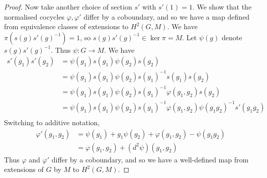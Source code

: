 \begin{proof}
    Now take another choice of section \( s' \) with \( s'(1) = 1 \).
    We show that the normalised cocycles \( \varphi, \varphi' \) differ by a coboundary, and so we have a map defined from equivalence classes of extensions to \( H^2(G, M) \).
    We have \( \pi(s(g) s'(g)^{-1}) = 1 \), so \( s(g) s'(g)^{-1} \in \ker \pi = M \).
    Let \( \psi(g) \) denote \( s(g) s'(g)^{-1} \).
    Thus \( \psi : G \to M \).
    We have
    \begin{align*}
        s'(g_1) s'(g_2) &= \psi(g_1) s(g_1) \psi(g_2) s(g_2) \\
        &= \psi(g_1) s(g_1) \psi(g_2) s(g_1)^{-1} s(g_1) s(g_2) \\
        &= \psi(g_1) s(g_1) \psi(g_2) s(g_1)^{-1} \varphi(g_1, g_2) s(g_2) \\
        &= \psi(g_1) s(g_1) \psi(g_2) s(g_1)^{-1} \varphi(g_1, g_2) \psi(g_1 g_2)^{-1} s'(g_1 g_2) \\
    \end{align*}
    Switching to additive notation,
    \begin{align*}
        \varphi'(g_1, g_2) &= \psi(g_1) + g_1 \psi(g_2) + \varphi(g_1, g_2) - \psi(g_1 g_2) \\
        &= \varphi(g_1, g_2) + (d^2 \psi)(g_1, g_2)
    \end{align*}
    Thus \( \varphi \) and \( \varphi' \) differ by a coboundary, and so we have a well-defined map from extensions of \( G \) by \( M \) to \( H^2(G, M) \).


\end{proof}
